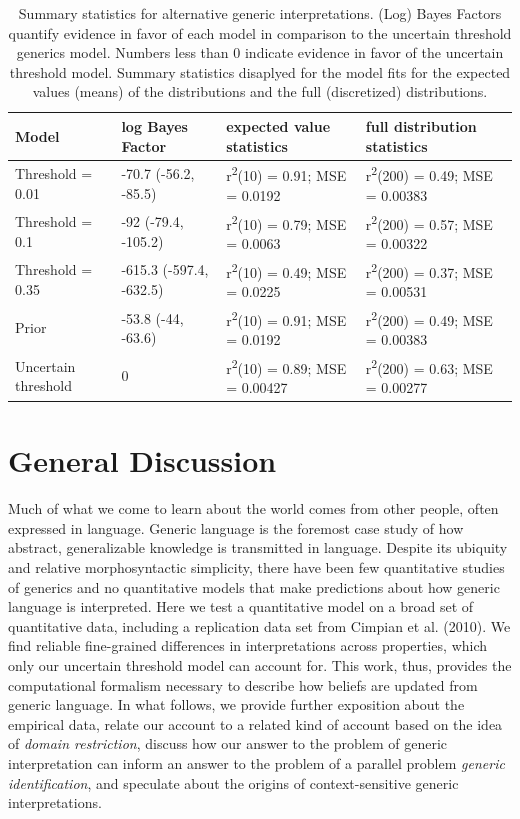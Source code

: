 \documentclass[floatsintext,man]{apa6}
\theoremstyle{definition}
\theoremstyle{definition}
\theoremstyle{definition}
\theoremstyle{remark}
\begin{document}
\begin{table}[H]
\centering
\begingroup\fontsize{9pt}{10pt}\selectfont
\begin{tabular}{llll}
  \hline
Model & log Bayes Factor & expected value statistics & full distribution statistics \\ 
  \hline
Threshold = 0.01 & -70.7 (-56.2, -85.5) & r\textsuperscript{2}(10) = 0.91; MSE = 0.0192 & r\textsuperscript{2}(200) = 0.49; MSE = 0.00383 \\ 
  Threshold = 0.1 & -92 (-79.4, -105.2) & r\textsuperscript{2}(10) = 0.79; MSE = 0.0063 & r\textsuperscript{2}(200) = 0.57; MSE = 0.00322 \\ 
  Threshold = 0.35 & -615.3 (-597.4, -632.5) & r\textsuperscript{2}(10) = 0.49; MSE = 0.0225 & r\textsuperscript{2}(200) = 0.37; MSE = 0.00531 \\ 
  Prior & -53.8 (-44, -63.6) & r\textsuperscript{2}(10) = 0.91; MSE = 0.0192 & r\textsuperscript{2}(200) = 0.49; MSE = 0.00383 \\ 
  Uncertain threshold & 0 & r\textsuperscript{2}(10) = 0.89; MSE = 0.00427 & r\textsuperscript{2}(200) = 0.63; MSE = 0.00277 \\ 
   \hline
\end{tabular}
\endgroup
\caption{Summary statistics for alternative generic interpretations. (Log) Bayes Factors quantify evidence in favor of each model in comparison to the uncertain threshold generics model. Numbers less than 0 indicate evidence in favor of the uncertain threshold model. Summary statistics disaplyed for the model fits for the expected values (means) of the distributions and the full (discretized) distributions.} 
\end{table}

\section{General Discussion}\label{general-discussion}

Much of what we come to learn about the world comes from other people,
often expressed in language. Generic language is the foremost case study
of how abstract, generalizable knowledge is transmitted in language.
Despite its ubiquity and relative morphosyntactic simplicity, there have
been few quantitative studies of generics and no quantitative models
that make predictions about how generic language is interpreted. Here we
test a quantitative model on a broad set of quantitative data, including
a replication data set from Cimpian et al. (2010). We find reliable
fine-grained differences in interpretations across properties, which
only our uncertain threshold model can account for. This work, thus,
provides the computational formalism necessary to describe how beliefs
are updated from generic language. In what follows, we provide further
exposition about the empirical data, relate our account to a related
kind of account based on the idea of \emph{domain restriction}, discuss
how our answer to the problem of generic interpretation can inform an
answer to the problem of a parallel problem \emph{generic
identification}, and speculate about the origins of context-sensitive
generic interpretations.
\end{document}
